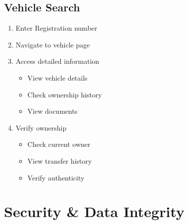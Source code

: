 \documentclass[12pt,a4paper]{article}
\begin{document}
    \subsection{Vehicle Search}
    \begin{enumerate}
        \item Enter Registration number

        \item Navigate to vehicle page

        \item Access detailed information
        \begin{itemize}
            \item View vehicle details
            \item Check ownership history
            \item View documents
        \end{itemize}

        \item Verify ownership
        \begin{itemize}
            \item Check current owner
            \item View transfer history
            \item Verify authenticity
        \end{itemize}
    \end{enumerate}


    \section{Security \& Data Integrity}
\end{document}
